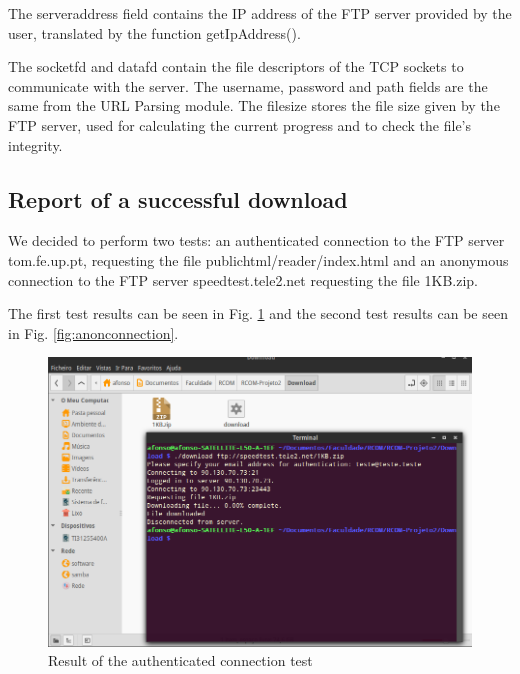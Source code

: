 \documentclass[11pt,a4paper,reqno]{article}
\numberwithin{equation}{section}
\begin{document}
	The server\textunderscore address field contains the IP address of the FTP server provided by the user, translated by the function getIpAddress().
	
	The socketfd and datafd contain the file descriptors of the TCP sockets to communicate with the server. The username, password and path fields are the same from the URL Parsing module. The file\textunderscore size stores the file size given by the FTP server, used for calculating the current progress and to check the file’s integrity.

	\subsection{Report of a successful download}

We decided to perform two tests: an authenticated connection to the FTP server tom.fe.up.pt, requesting the file public\textunderscore html/reader/index.html and an anonymous connection to the FTP server speedtest.tele2.net requesting the file 1KB.zip.

The first test results can be seen in Fig. \ref{fig:authconnection} and the second test results can be seen in Fig. \ref{fig:anonconnection}.

\begin{figure}[p]
\centering
\includegraphics[scale=0.5]{authtest.png}
\caption{Result of the authenticated connection test}
\label{fig:authconnection}
\end{figure}
\end{document}
